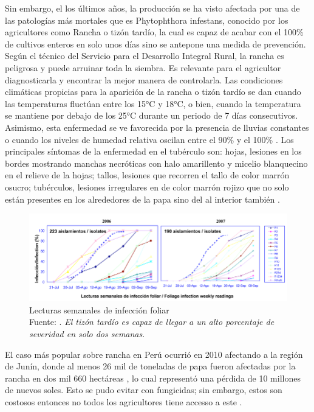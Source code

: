 Sin embargo, el los últimos años, la producción se ha visto afectada por una de las patologías más mortales que es Phytophthora infestans, conocido por los agricultores como Rancha o tizón tardío, la cual es capaz de acabar con el 100\% de cultivos enteros en solo unos días sino se antepone una medida de prevención. Según el técnico del Servicio para el Desarrollo Integral Rural,   la rancha es peligrosa y puede arruinar  toda la siembra. Es relevante para el agricultor diagnosticarla y encontrar la mejor manera de controlarla. Las condiciones climáticas propicias para la aparición de la rancha o tizón tardío se dan cuando las temperaturas fluctúan entre los 15°C y 18°C, o bien, cuando la temperatura se mantiene por debajo de los 25°C durante un periodo de 7 días consecutivos. Asimismo, esta enfermedad se ve favorecida por la presencia de lluvias constantes o cuando los niveles de humedad relativa oscilan entre el 90\% y el 100\% \cite{cr_rancha1}. Los principales síntomas de la enfermedad en el tubérculo son: hojas, lesiones en los bordes mostrando manchas necróticas con halo amarillento y micelio blanquecino en el relieve de la hojas; tallos, lesiones que recorren el tallo de color marrón osucro; tubérculos, lesiones irregulares en de color marrón rojizo que no solo están presentes en los alrededores de la papa sino del al interior también \parencite{cr_rancha2}. 

\begin{figure}[h]
	\begin{center}
		\includegraphics[width=1\textwidth]{1/figures/evolucionrancha.png}
		\caption[Lecturas semanales de infección foliar]{Lecturas semanales de infección foliar\\
			Fuente: \cite{cr_gestion2018emprend}. \textit{El tizón tardío es capaz de llegar a un alto porcentaje de severidad en solo dos semanas}.}
		\label{1:fig}
	\end{center}
\end{figure}

El caso más popular sobre rancha en Perú ocurrió en 2010 afectando a la región de Junín, donde al menos 26 mil de toneladas de papa fueron afectadas por la rancha en dos mil 660 hectáreas , lo cual representó una pérdida de 10 millones de nuevos soles. Esto se pudo evitar con fungicidas; sin embargo, estos son costosos entonces no todos los agricultores tiene accesso a este \parencite{cr_rancha6}. 

